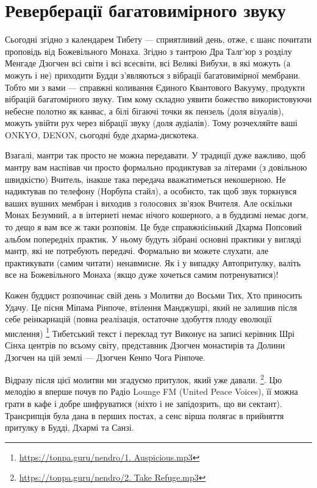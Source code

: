 \section{Реверберації багатовимірного звуку}

Сьогодні згідно з календарем Тибету --- сприятливий день,
отже, є шанс почитати проповідь від Божевільного Монаха.
Згідно з тантрою Дра Талг'юр з розділу Менгаде Дзогчен всі
світи і всі всесвіти, всі Великі Вибухи, в які можуть
(а можуть і не) приходити Будди з'являються з вібрації
багатовимірної мембрани. Тобто ми з вами --- справжні
коливання Єдиного Квантового Вакууму, продукти
вібрацій багатомірного звуку. Тим кому складно уявити
божество використовуючи небесне полотно як канвас, а білі
бігаючі точки як пензель (доля візуалів), можуть увійти
рух через вібрації звуку (доля аудіалів). Тому
розчехляйте ваші ONKYO, DENON, сьогодні буде дхарма-дискотека.

Взагалі, мантри так просто не можна передавати. У традиції
дуже важливо, щоб мантру вам наспівав чи просто формально
продиктував за літерами (з довільною швидкістю) Вчитель,
інакше така передача вважатиметься некошерною. Не надиктував
по телефону (Норбупа стайл), а особисто, так щоб звук
торкнувся ваших вушних мембран і виходив з голосових
зв'язок Вчителя. Але оскільки Монах Безумний, а в інтернеті
немає нічого кошерного, а в буддизмі немає догм, то дещо я
вам все ж таки розповім. Це буде справжнісінький Дхарма Попсовий
альбом попередніх практик. У ньому будуть зібрані основні
практики у вигляді мантр, які не потребують передачі. Формально
ви можете слухати, але практикувати (самим читати) ненавмисне.
Як і у випадку Автопритулку, валіть все на Божевільного
Монаха (якщо дуже хочеться самим потренуватися)!

Кожен буддист розпочинає свій день з Молитви до Восьми
Тих, Хто приносить Удачу. Це пісня Міпама Рінпоче, втілення
Манджушрі, який не залишив після себе реінкарнацій (повна
реалізація, остаточне здобуття плоду еволюції мислення)
\footnote {\url{https://tonpa.guru/nendro/1. Auspicious.mp3}}
Тибетський текст і переклад тут Виконує на записі керівник Шрі
Сінха центрів по всьому світу, представник Дзогчен монастирів
та Долини Дзогчен на цій землі --- Дзогчен Кенпо Чога Рінпоче.

Відразу після цієї молитви ми згадуємо притулок, який уже давали.
\footnote{\url{https://tonpa.guru/nendro/2. Take Refuge.mp3}}.
Цю мелодію я вперше почув по Радіо Lounge FM (United Peace Voices),
її можна грати в кафе і добре шифруватися (ніхто і не запідозрить, що ви сектант).
Трансрипція була дана в перших постах, а сенс вірша полягає в
прийняття притулку в Будді, Дхармі та Санзі.

